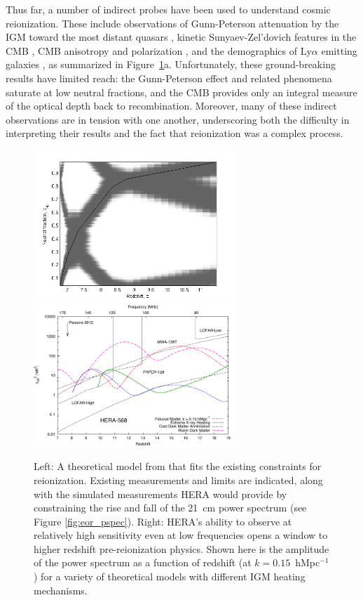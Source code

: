 \documentclass[preprint]{aastex}
\begin{document}
Thus far, a number of indirect probes have been used to understand cosmic
reionization.  These include observations of Gunn-Peterson attenuation by the
IGM toward the most distant quasars \citep{fan_et_al2006,bouwens_et_al2010},
kinetic Sunyaev-Zel'dovich features in the CMB \citep{zahn_et_al2012}, CMB
anisotropy and polarization \citep{page_et_al2007,planck_et_al2013}, and the
demographics of Ly$\alpha$ emitting galaxies
\citep{treu_et_al2013}, as summarized in Figure~\ref{fig:x_i_Xray}a.  Unfortunately,
these ground-breaking results have limited reach: the
Gunn-Peterson effect and related phenomena saturate at low neutral fractions,
and the CMB provides only an integral measure of the optical depth
back to recombination.  Moreover, many of these indirect observations are in
tension with one another, underscoring both the difficulty in interpreting
their results and the fact that reionization was a complex process.


\begin{figure}[t]\centering
\includegraphics[width=3in]{plots/constraints.png}
~ %
\includegraphics[width=3in]{plots/Xray.pdf}
\caption{\small
Left: A theoretical model from \citet{robertson_2013} that fits the existing constraints for reionization. Existing measurements and limits are indicated, along with the simulated measurements HERA would provide by constraining the rise and fall of the 21~cm power spectrum (see Figure \ref{fig:eor_pspec}).
Right: HERA's ability to
observe at relatively high sensitivity even at low frequencies opens a window to
higher redshift pre-reionization physics.  Shown here is the amplitude of the power spectrum as a function of redshift (at $k =  0.15$~hMpc$^{-1}$) for a variety of theoretical models with different IGM heating mechanisms.
}\label{fig:x_i_Xray}
\end{figure}
\end{document}
